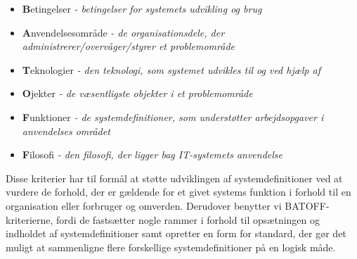 \begin{itemize}[noitemsep]
\item \textbf{B}etingelser \textit{- betingelser for systemets udvikling og brug}
\item \textbf{A}nvendelsesområde \textit{- de organisationsdele, der administrerer/overvåger/styrer et problemområde}
\item \textbf{T}eknologier \textit{- den teknologi, som systemet udvikles til og ved hjælp af}
\item \textbf{O}jekter \textit{- de væsentligste objekter i et problemområde}
\item \textbf{F}unktioner \textit{- de systemdefinitioner, som understøtter arbejdsopgaver i anvendelses området}
\item \textbf{F}ilosofi \textit{- den filosofi, der ligger bag IT-systemets anvendelse}
\end{itemize}

Disse kriterier har til formål at støtte udviklingen af systemdefinitioner ved at vurdere de forhold, der er gældende for et givet systems funktion i forhold til en organisation eller forbruger og omverden. Derudover benytter vi BATOFF-kriterierne, fordi de fastsætter nogle rammer i forhold til opsætningen og indholdet af systemdefinitioner samt opretter en form for standard, der gør det muligt at sammenligne flere forskellige systemdefinitioner på en logisk måde.




